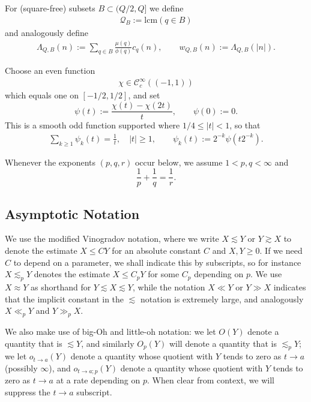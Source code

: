 \documentclass[12pt,leqno]{amsart}
\numberwithin{equation}{section}
\theoremstyle{definition}
\theoremstyle{plain}
\begin{document}
	For (square-free) subsets $B \subset (Q/2,Q]$
	we define
	\begin{align}\label{e:lcmQ}
		\mathcal{Q}_B := \text{lcm}( q \in B )
	\end{align}
	and analogously define
	\begin{align}\label{e:WQB}
		\Lambda_{Q,B}(n) := \sum_{q \in B} \frac{\mu(q)}{\phi(q)} c_q(n), \qquad w_{Q,B}(n) := \Lambda_{Q,B}(|n|).
	\end{align}
	
	Choose an even function 
	\begin{align}\label{e:chi} 
		\chi\in\mathcal C_c^\infty((-1,1))
	\end{align}
	which equals one on $[-1/2,1/2]$, and set
	\[
	\psi(t):=\frac{\chi(t)-\chi(2t)}{t},\qquad \psi(0):=0.
	\]
	This is a smooth odd function supported where $1/4\leq|t|<1$, so that
	\begin{align}
		\sum_{k\geq1}\psi_k(t)=\frac1t,\quad |t|\geq1,
		\qquad \psi_k(t):=2^{-k}\psi(t2^{-k}).
	\end{align}
	
	Whenever the exponents $(p,q,r)$ occur below, we assume $1<p,q<\infty$ and 
	\[ \frac{1}{p} + \frac{1}{q} = \frac{1}{r}.\]
	
	\subsection{Asymptotic Notation}\label{sss:O}
	We use the modified Vinogradov notation, where we write $X \lesssim Y$ or $Y \gtrsim X$ to denote
	the estimate $X \leq CY$ for an absolute constant $C$ and $X, Y \geq 0.$  If we need $C$ to depend on a
	parameter, we shall indicate this by subscripts, so for instance $X \lesssim_p Y$ denotes the estimate $X \leq C_p Y$ for some $C_p$ depending on $p$. We use $X \approx Y$ as shorthand for $Y \lesssim X \lesssim Y$, while the notation $X \ll Y$ or $Y \gg X$ indicates that the implicit constant in the $\lesssim$ notation is extremely large, and analogously $X \ll_p Y$ and $Y \gg_p X$.
	
	We also make use of big-Oh and little-oh notation: we let $O(Y)$  denote a quantity that is $\lesssim Y$, and similarly
	$O_p(Y )$ will denote a quantity that is $\lesssim_p Y$; we let $o_{t \to a}(Y)$
	denote a quantity whose quotient with $Y$ tends to zero as $t \to a$ (possibly $\infty$), and
	$o_{t \to a;p}(Y)$
	denote a quantity whose quotient with $Y$ tends to zero as $t \to a$ at a rate depending on $p$. When clear from context, we will suppress the $t \to a$ subscript.
	
\end{document}
